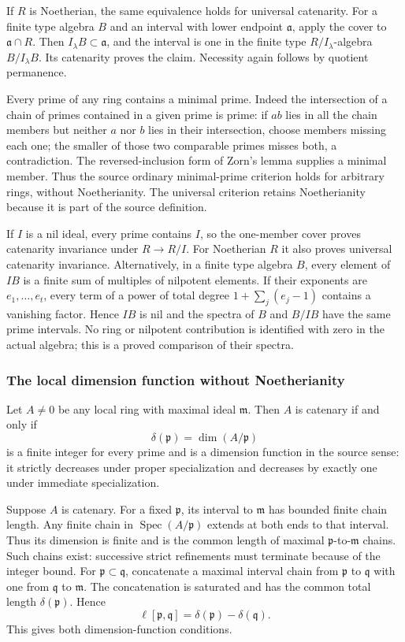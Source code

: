 If \(R\) is Noetherian, the same equivalence holds for universal catenarity. For a finite type algebra \(B\) and an interval with lower endpoint \(\mathfrak a\), apply the cover to \(\mathfrak a\cap R\). Then \(I_\lambda B\subset\mathfrak a\), and the interval is one in the finite type \(R/I_\lambda\)-algebra \(B/I_\lambda B\). Its catenarity proves the claim. Necessity again follows by quotient permanence.

Every prime of any ring contains a minimal prime. Indeed the intersection of a chain of primes contained in a given prime is prime: if \(ab\) lies in all the chain members but neither \(a\) nor \(b\) lies in their intersection, choose members missing each one; the smaller of those two comparable primes misses both, a contradiction. The reversed-inclusion form of Zorn's lemma supplies a minimal member. Thus the source ordinary minimal-prime criterion holds for arbitrary rings, without Noetherianity. The universal criterion retains Noetherianity because it is part of the source definition.

If \(I\) is a nil ideal, every prime contains \(I\), so the one-member cover proves catenarity invariance under \(R\to R/I\). For Noetherian \(R\) it also proves universal catenarity invariance. Alternatively, in a finite type algebra \(B\), every element of \(IB\) is a finite sum of multiples of nilpotent elements. If their exponents are \(e_1,\ldots,e_t\), every term of a power of total degree \(1+\sum_j(e_j-1)\) contains a vanishing factor. Hence \(IB\) is nil and the spectra of \(B\) and \(B/IB\) have the same prime intervals. No ring or nilpotent contribution is identified with zero in the actual algebra; this is a proved comparison of their spectra.

\subsubsection{The local dimension function without Noetherianity}\label{algebra-proof-020-the-local-dimension-function-without-noetherianity}

Let \(A\ne0\) be any local ring with maximal ideal \(\mathfrak m\). Then \(A\) is catenary if and only if \[
 \delta(\mathfrak p)=\dim(A/\mathfrak p)
\] is a finite integer for every prime and is a dimension function in the source sense: it strictly decreases under proper specialization and decreases by exactly one under immediate specialization.

Suppose \(A\) is catenary. For a fixed \(\mathfrak p\), its interval to \(\mathfrak m\) has bounded finite chain length. Any finite chain in \(\operatorname{Spec}(A/\mathfrak p)\) extends at both ends to that interval. Thus its dimension is finite and is the common length of maximal \(\mathfrak p\)-to-\(\mathfrak m\) chains. Such chains exist: successive strict refinements must terminate because of the integer bound. For \(\mathfrak p\subset\mathfrak q\), concatenate a maximal interval chain from \(\mathfrak p\) to \(\mathfrak q\) with one from \(\mathfrak q\) to \(\mathfrak m\). The concatenation is saturated and has the common total length \(\delta(\mathfrak p)\). Hence \[
 \ell[\mathfrak p,\mathfrak q]
 =\delta(\mathfrak p)-\delta(\mathfrak q).
\] This gives both dimension-function conditions.

